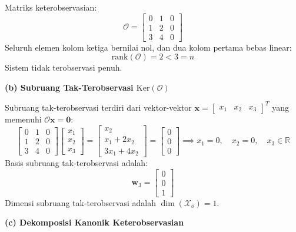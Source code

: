 \documentclass[11pt,a4paper]{article}
\begin{document}
Matriks keterobservasian:
$$\mathcal{O} = \begin{bmatrix} 0 & 1 & 0 \\ 1 & 2 & 0 \\ 3 & 4 & 0 \end{bmatrix}$$
Seluruh elemen kolom ketiga bernilai nol, dan dua kolom pertama bebas linear:
$$\text{rank}(\mathcal{O}) = 2 < 3 = n$$
Sistem tidak terobservasi penuh.

\textbf{(b) Subruang Tak-Terobservasi $\text{Ker}(\mathcal{O})$}

Subruang tak-terobservasi terdiri dari vektor-vektor $\mathbf{x} = \begin{bmatrix} x_1 & x_2 & x_3 \end{bmatrix}^T$ yang memenuhi $\mathcal{O}\mathbf{x} = \mathbf{0}$:
$$\begin{bmatrix} 0 & 1 & 0 \\ 1 & 2 & 0 \\ 3 & 4 & 0 \end{bmatrix} \begin{bmatrix} x_1 \\ x_2 \\ x_3 \end{bmatrix} = \begin{bmatrix} x_2 \\ x_1 + 2x_2 \\ 3x_1 + 4x_2 \end{bmatrix} = \begin{bmatrix} 0 \\ 0 \\ 0 \end{bmatrix} \implies x_1 = 0, \quad x_2 = 0, \quad x_3 \in \mathbb{R}$$
Basis subruang tak-terobservasi adalah:
$$\mathbf{w}_3 = \begin{bmatrix} 0 \\ 0 \\ 1 \end{bmatrix}$$
Dimensi subruang tak-terobservasi adalah $\dim(\mathcal{X}_{\bar{o}}) = 1$.

\textbf{(c) Dekomposisi Kanonik Keterobservasian}
\end{document}
